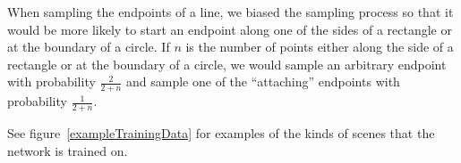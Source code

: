 \documentclass{article}
\begin{document}
When sampling the endpoints of a line,
we biased the sampling process so that it would
be more likely to start an endpoint
along one of the sides of a rectangle or at the boundary of a circle.
If $n$ is the number of points either along the side of a rectangle or at the boundary of a circle,
we would sample an arbitrary endpoint with probability $\frac{2}{2 + n}$
and sample one of the ``attaching'' endpoints with probability $\frac{1}{2 + n}$.

See figure~\ref{exampleTrainingData} for examples of the kinds of scenes that the network is trained on.
\begin{figure}
  \begin{minipage}[t]{2.2cm}\end{minipage}
  \begin{minipage}[t]{2.2cm}\end{minipage}
  \begin{minipage}[t]{2.2cm}\end{minipage}
  \begin{minipage}[t]{2.2cm}\end{minipage}
      \begin{minipage}[t]{2.2cm}\end{minipage}\\

\end{figure}
\end{document}
